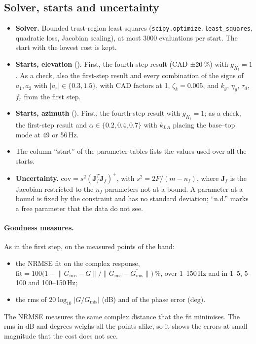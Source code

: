 \documentclass[10pt,a4paper]{article}
\numberwithin{equation}{section}
\begin{document}
\subsection{Solver, starts and uncertainty}
\begin{itemize}
\item \textbf{Solver.} Bounded trust-region least squares (\texttt{scipy.optimize.least\_squares}, quadratic loss, Jacobian scaling), at most 3000 evaluations per start. The start with the lowest cost is kept.
\item \textbf{Starts, elevation} (\nStartsP). First, the fourth-step result (CAD $\pm20$\,\%) with $g_{K_t}=1$. As a check, also the first-step result and every combination of the signs of $a_1,a_2$ with $|a_r|\in\{0.3,1.5\}$, with CAD factors at 1, $\zeta_k=0.005$, and $k_g$, $\eta_g$, $\tau_d$, $f_r$ from the first step.
\item \textbf{Starts, azimuth} (\nStartsA). First, the fourth-step result with $g_{K_t}=1$; as a check, the first-step result and $\alpha\in\{0.2,0.4,0.7\}$ with $k_{LA}$ placing the base--top mode at 49 or 56\,Hz.
\item The column ``start'' of the parameter tables lists the values used over all the starts.
\item \textbf{Uncertainty.} $\mathrm{cov}=s^2(\mathbf J_f^T\mathbf J_f)^{+}$, with $s^2=2F/(m-n_f)$, where $\mathbf J_f$ is the Jacobian restricted to the $n_f$ parameters not at a bound. A parameter at a bound is fixed by the constraint and has no standard deviation; ``n.d.'' marks a free parameter that the data do not see.
\end{itemize}

\paragraph{Goodness measures.} As in the first step, on the measured points of the band:
\begin{itemize}
\item the NRMSE fit on the complex response, $\mathrm{fit}=100\bigl(1-\lVert G_\mathrm{mis}-G\rVert/\lVert G_\mathrm{mis}-\overline{G_\mathrm{mis}}\rVert\bigr)\,\%$, over 1--150\,Hz and in 1--5, 5--100 and 100--150\,Hz;
\item the rms of $20\log_{10}|G/G_\mathrm{mis}|$ (dB) and of the phase error (deg).
\end{itemize}
The NRMSE measures the same complex distance that the fit minimises. The rms in dB and degrees weighs all the points alike, so it shows the errors at small magnitude that the cost does not see.
\end{document}
